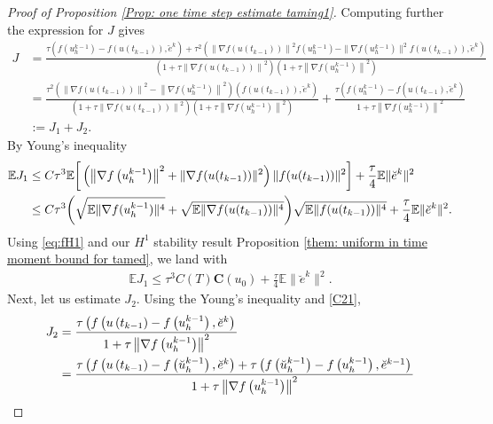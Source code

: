 \documentclass[10pt,a4paper]{amsart}
\newcommand{\con}{\mathbf{C}}
\begin{document}
\begin{proof}[Proof of Proposition \ref{Prop: one time  step estimate taming1}]
Computing further the expression for $J$ gives
$$
\begin{aligned}
J & =\frac{\tau\left(f\left(u_h^{k-1}\right)-f\left(u\left(t_{k-1}\right)\right), \breve{e}^k\right)+\tau^2\left(\left\|\nabla f\left(u\left(t_{k-1}\right)\right)\right\|^2 f\left(u_h^{k-1}\right)-\| \nabla f\left(u_h^{k-1}\right) \|^2 f\left(u\left(t_{k-1}\right)\right), \breve{e}^k\right)}{\left(1+\tau\left\|\nabla f\left(u\left(t_{k-1}\right)\right)\right\|^2\right)\left(1+\tau\left\|\nabla f\left(u_h^{k-1}\right)\right\|^2\right)} \\
& =\frac{\tau^2\left(\left\|\nabla f\left(u\left(t_{k-1}\right)\right)\right\|^2-\left\|\nabla f\left(u_h^{k-1}\right)\right\|^2\right)\left(f\left(u\left(t_{k-1}\right)\right), \breve{e}^k\right)}{\left(1+\tau\left\|\nabla f\left(u\left(t_{k-1}\right)\right)\right\|^2\right)\left(1+\tau\left\|\nabla f\left(u_h^{k-1}\right)\right\|^2\right)}+\frac{\tau\left(f\left(u_h^{k-1}\right)-f\left(u\left(t_{k-1}\right), \breve{e}^k\right)\right.}{1+\tau\left\|\nabla f\left(u_h^{k-1}\right)\right\|^2}\\
&:=J_1+J_2.
\end{aligned}
$$
By Young's inequality
\begin{align}
\mathbb{E} J_1 & \leq C \tau^3 \mathbb{E}
\bigg[\left(\left\|\nabla f\left(u_h^{k-1}\right)\right\|^2
+\|\nabla f(u(t_{k-1}))\|^2 \right)\|f(u(t_{k-1}))\|^2\bigg]+\frac{\tau}{4} \mathbb{E}\| \breve{e}^k\|^2 \notag \\
&\leq C\tau^3\bigg(\sqrt{\mathbb{E}\|\nabla f(u_h^{k-1})\|^4}+\sqrt{\mathbb{E}\|\nabla f(u(t_{k-1}))\|^4} \bigg)\sqrt{\mathbb{E}\|f(u(t_{k-1}))\|^4}
+\frac{\tau}{4} \mathbb{E}\|\breve{e}^k\|^2.
\end{align}
Using \eqref{eq:fH1}  and  our $H^1$ stability result Proposition \ref{them: uniform in time moment bound for tamed}, we land with 
\begin{align}
\mathbb{E}J_1\leq \tau^3 C(T)\con(u_0)+\frac{\tau}{4} \mathbb{E}\|\breve{e}^k\|^2.
\end{align}
Next, let us estimate $J_2$. Using the Young's inequality and \eqref{C21}, 
\begin{align}
J_2 & =\frac{\tau\left(
f\left(u\left(t_{k-1}\right)-f\left(u_h^{k-1}\right), \breve{e}^k\right)\right.}{1+\tau\left\|\nabla f\left(u_h^{k-1}\right)\right\|^2} \\
& =\frac{\tau\left(f\left(u\left(t_{k-1}\right)-f\left(\breve{u}_h^{k-1}\right), \breve{e}^k\right)+\tau\left( f\left(\breve{u}_h^{k-1}\right)-f\left(u_h^{k-1}\right), \breve{e}^{k-1}\right)\right.}{1+\tau\left\|\nabla f\left(u_h^{k-1}\right)\right\|^2} \notag\\

\end{align}
\end{proof}
\end{document}
